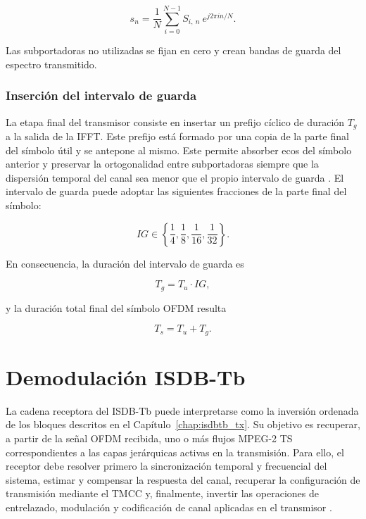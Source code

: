 \begin{equation}
s_n =
\frac{1}{N}
\sum_{i=0}^{N-1}
S_{i,\ n}\ e^{j2\pi in/N}.
\end{equation}

Las subportadoras no utilizadas se fijan en cero y crean bandas de guarda del espectro transmitido.

\subsection{Inserción del intervalo de guarda}

La etapa final del transmisor consiste en insertar un prefijo cíclico de duración $T_g$ a la salida de la IFFT. Este prefijo está formado por una copia de la parte final del símbolo útil y se antepone al mismo. Este permite absorber ecos del símbolo anterior y preservar la ortogonalidad entre subportadoras siempre que la dispersión temporal del canal sea menor que el propio intervalo de guarda \cite{portugues}. El intervalo de guarda puede adoptar las siguientes fracciones de la parte final del símbolo:

\begin{equation}
IG \in \left\{\frac14,\frac18,\frac1{16},\frac1{32}\right\}.
\end{equation}

En consecuencia, la duración del intervalo de guarda es

\begin{equation}
T_g = T_u \cdot IG,
\end{equation}

y la duración total final del símbolo OFDM resulta

\begin{equation}
T_s = T_u + T_g.
\end{equation}




\chapter{Demodulación ISDB-Tb}
\label{chap:isdbtb_rx}


La cadena receptora del ISDB-Tb puede interpretarse como la inversión ordenada de los bloques descritos en el Capítulo~\ref{chap:isdbtb_tx}. Su objetivo es recuperar, a partir de la señal OFDM recibida, uno o más flujos MPEG-2 TS correspondientes a las capas jerárquicas activas en la transmisión. Para ello, el receptor debe resolver primero la sincronización temporal y frecuencial del sistema, estimar y compensar la respuesta del canal, recuperar la configuración de transmisión mediante el TMCC y, finalmente, invertir las operaciones de entrelazado, modulación y codificación de canal aplicadas en el transmisor \cite{isdbt,portugues,uruguay_rx}.

